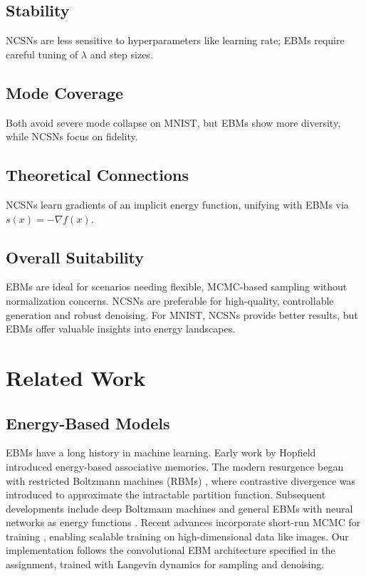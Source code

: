 \documentclass[a4paper,12pt]{article}
\begin{document}
\subsection{Stability}
NCSNs are less sensitive to hyperparameters like learning rate; EBMs require careful tuning of $\lambda$ and step sizes.

\subsection{Mode Coverage}
Both avoid severe mode collapse on MNIST, but EBMs show more diversity, while NCSNs focus on fidelity.

\subsection{Theoretical Connections}
NCSNs learn gradients of an implicit energy function, unifying with EBMs via $s(x) = -\nabla f(x)$.

\subsection{Overall Suitability}
EBMs are ideal for scenarios needing flexible, MCMC-based sampling without normalization concerns. NCSNs are preferable for high-quality, controllable generation and robust denoising. For MNIST, NCSNs provide better results, but EBMs offer valuable insights into energy landscapes.

\section{Related Work}
\subsection{Energy-Based Models}
EBMs have a long history in machine learning. Early work by Hopfield \cite{hopfield1982neural} introduced energy-based associative memories. The modern resurgence began with restricted Boltzmann machines (RBMs) \cite{smolensky1986information, hinton2002training}, where contrastive divergence was introduced to approximate the intractable partition function. Subsequent developments include deep Boltzmann machines \cite{salakhutdinov2009deep} and general EBMs with neural networks as energy functions \cite{lecun2006tutorial}. Recent advances incorporate short-run MCMC for training \cite{du2019implicit, nijkamp2019learning}, enabling scalable training on high-dimensional data like images. Our implementation follows the convolutional EBM architecture specified in the assignment, trained with Langevin dynamics for sampling and denoising.
\end{document}
